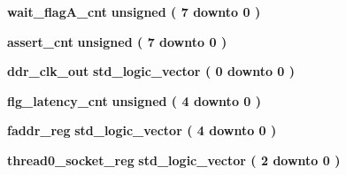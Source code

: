\begin{DoxyCompactItemize}
{\bf wait\+\_\+flag\+A\+\_\+cnt} {\bfseries \textcolor{comment}{unsigned}\textcolor{vhdlchar}{ }\textcolor{vhdlchar}{(}\textcolor{vhdlchar}{ }\textcolor{vhdlchar}{ } \textcolor{vhdldigit}{7} \textcolor{vhdlchar}{ }\textcolor{keywordflow}{downto}\textcolor{vhdlchar}{ }\textcolor{vhdlchar}{ } \textcolor{vhdldigit}{0} \textcolor{vhdlchar}{ }\textcolor{vhdlchar}{)}\textcolor{vhdlchar}{ }} 
\item 
{\bf assert\+\_\+cnt} {\bfseries \textcolor{comment}{unsigned}\textcolor{vhdlchar}{ }\textcolor{vhdlchar}{(}\textcolor{vhdlchar}{ }\textcolor{vhdlchar}{ } \textcolor{vhdldigit}{7} \textcolor{vhdlchar}{ }\textcolor{keywordflow}{downto}\textcolor{vhdlchar}{ }\textcolor{vhdlchar}{ } \textcolor{vhdldigit}{0} \textcolor{vhdlchar}{ }\textcolor{vhdlchar}{)}\textcolor{vhdlchar}{ }} 
\item 
{\bf ddr\+\_\+clk\+\_\+out} {\bfseries \textcolor{comment}{std\+\_\+logic\+\_\+vector}\textcolor{vhdlchar}{ }\textcolor{vhdlchar}{(}\textcolor{vhdlchar}{ }\textcolor{vhdlchar}{ } \textcolor{vhdldigit}{0} \textcolor{vhdlchar}{ }\textcolor{keywordflow}{downto}\textcolor{vhdlchar}{ }\textcolor{vhdlchar}{ } \textcolor{vhdldigit}{0} \textcolor{vhdlchar}{ }\textcolor{vhdlchar}{)}\textcolor{vhdlchar}{ }} 
\item 
{\bf flg\+\_\+latency\+\_\+cnt} {\bfseries \textcolor{comment}{unsigned}\textcolor{vhdlchar}{ }\textcolor{vhdlchar}{(}\textcolor{vhdlchar}{ }\textcolor{vhdlchar}{ } \textcolor{vhdldigit}{4} \textcolor{vhdlchar}{ }\textcolor{keywordflow}{downto}\textcolor{vhdlchar}{ }\textcolor{vhdlchar}{ } \textcolor{vhdldigit}{0} \textcolor{vhdlchar}{ }\textcolor{vhdlchar}{)}\textcolor{vhdlchar}{ }} 
\item 
{\bf faddr\+\_\+reg} {\bfseries \textcolor{comment}{std\+\_\+logic\+\_\+vector}\textcolor{vhdlchar}{ }\textcolor{vhdlchar}{(}\textcolor{vhdlchar}{ }\textcolor{vhdlchar}{ } \textcolor{vhdldigit}{4} \textcolor{vhdlchar}{ }\textcolor{keywordflow}{downto}\textcolor{vhdlchar}{ }\textcolor{vhdlchar}{ } \textcolor{vhdldigit}{0} \textcolor{vhdlchar}{ }\textcolor{vhdlchar}{)}\textcolor{vhdlchar}{ }} 
\item 
{\bf thread0\+\_\+socket\+\_\+reg} {\bfseries \textcolor{comment}{std\+\_\+logic\+\_\+vector}\textcolor{vhdlchar}{ }\textcolor{vhdlchar}{(}\textcolor{vhdlchar}{ }\textcolor{vhdlchar}{ } \textcolor{vhdldigit}{2} \textcolor{vhdlchar}{ }\textcolor{keywordflow}{downto}\textcolor{vhdlchar}{ }\textcolor{vhdlchar}{ } \textcolor{vhdldigit}{0} \textcolor{vhdlchar}{ }\textcolor{vhdlchar}{)}\textcolor{vhdlchar}{ }} 
\item 

\end{DoxyCompactItemize}
